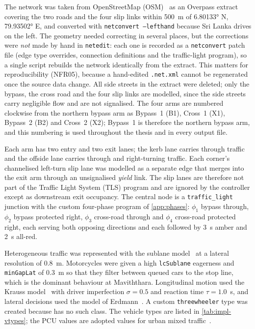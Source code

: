 The network was taken from OpenStreetMap (OSM)~\cite{haklay2008osm} as an Overpass extract covering the two
roads and the four slip links within 500~m of \ang{6.80133} N, \ang{79.93502} E, and converted with
\texttt{netconvert --lefthand} because Sri Lanka drives on the left. The geometry needed correcting in several
places, but the corrections were \emph{not} made by hand in \texttt{netedit}: each one is recorded as a
\texttt{netconvert} patch file (edge type overrides, connection definitions and the traffic-light program), so
a single script rebuilds the network identically from the extract. This matters for reproducibility (NFR05),
because a hand-edited \texttt{.net.xml} cannot be regenerated once the source data change. All side streets in
the extract were deleted; only the bypass, the cross road and the four slip links are modelled, since the side
streets carry negligible flow and are not signalised. The four arms are numbered clockwise from the northern
bypass arm as Bypass~1 (B1), Cross~1 (X1), Bypass~2 (B2) and Cross~2 (X2); Bypass~1 is therefore the northern
bypass arm, and this numbering is used throughout the thesis and in every output file.

Each arm has two entry and two exit lanes; the kerb lane carries through traffic
and the offside lane carries through and right-turning traffic. Each corner's channelised left-turn
slip lane was modelled as a separate edge that merges into the exit arm through an unsignalised
\emph{yield} link. The slip lanes are therefore not part of the Traffic Light System (TLS) program and
are ignored by the controller except as downstream exit occupancy. The central node is a
\texttt{traffic\_light} junction with the custom four-phase program of \cref{app:phases}: $\phi_1$
bypass through, $\phi_2$ bypass protected right, $\phi_3$ cross-road through and $\phi_4$ cross-road
protected right, each serving both opposing directions and each followed by 3~s amber and 2~s all-red.

Heterogeneous traffic was represented with the sublane model~\cite{sumo_sublane} at a lateral
resolution of 0.8~m. Motorcycles were given a high \texttt{lcSublane} eagerness and
\texttt{minGapLat} of 0.3~m so that they filter between queued cars to the stop line, which is the
dominant behaviour at Maviththara. Longitudinal motion used the Krauss model~\cite{krauss1998} with
driver imperfection $\sigma = 0.5$ and reaction time $\tau = 1.0$~s, and lateral decisions used the
model of Erdmann~\cite{erdmann2015lanechange}. A custom \texttt{threewheeler} type was created because
\sumo{} has no such class. The vehicle types are listed in \cref{tab:impl-vtypes}; the PCU values are
adopted values for urban mixed traffic~\cite{irc106}.

